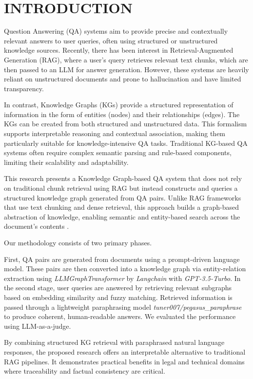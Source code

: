

\section{INTRODUCTION}
Question Answering (QA) systems aim to provide precise and contextually relevant answers to user queries, often using structured or unstructured knowledge sources. Recently, there has been interest in Retrieval-Augmented Generation (RAG)\cite{lewis2020retrieval}, where a user's query retrieves relevant text chunks, which are then passed to an LLM for answer generation. However, these systems are heavily reliant on unstructured documents and prone to hallucination \cite{xu2024hallucination, ji2023survey} and have limited transparency.

In contrast, Knowledge Graphs (KGs) provide a structured representation of information in the form of entities (nodes) and their relationships (edges). The KGs can be created from both structured and unstructured data. This formalism supports interpretable reasoning and contextual association, making them particularly suitable for knowledge-intensive QA tasks. Traditional KG-based QA systems often require complex semantic parsing and rule-based components, limiting their scalability and adaptability.

This research presents a Knowledge Graph-based QA system that does not rely on traditional chunk retrieval using RAG but instead constructs and queries a structured knowledge graph generated from QA pairs. Unlike RAG frameworks that use text chunking and dense retrieval, this approach builds a graph-based abstraction of knowledge, enabling semantic and entity-based search across the document's contents \cite{edge2024local, larson2024graphragblog, peng2024graph}.

Our methodology consists of two primary phases. 

First, QA pairs are generated from documents using a prompt-driven language model. These pairs are then converted into a knowledge graph via entity-relation extraction using \textit{LLMGraphTransformer} by \textit{Langchain} with \textit{GPT-3.5-Turbo}. In the second stage, user queries are answered by retrieving relevant subgraphs based on embedding similarity and fuzzy matching. Retrieved information is passed through a lightweight paraphrasing model \textit{tuner007/pegasus\_paraphrase} to produce coherent, human-readable answers. We evaluated the performance using LLM-as-a-judge.

By combining structured KG retrieval with paraphrased natural language responses, the proposed research offers an interpretable alternative to traditional RAG pipelines. It demonstrates practical benefits in legal and technical domains where traceability and factual consistency are critical.

